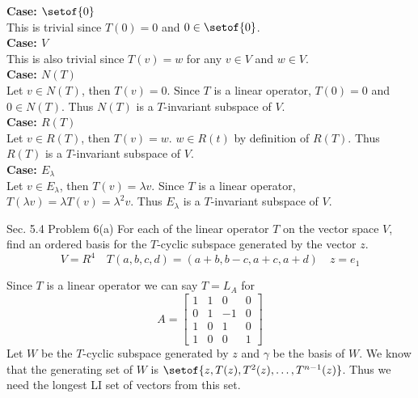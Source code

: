 \documentclass[answers,12pt,addpoints]{exam}
\begin{document}
\begin{questions}
    \begin{solution}
        \textbf{Case: $\setof{0}$}\\
        This is trivial since $T(0) = 0$ and $0 \in \setof{0}$.\\
        \textbf{Case: $V$}\\
        This is also trivial since $T(v) = w$ for any $v \in V$ and $w \in V$.\\
        \textbf{Case: $N(T)$}\\
        Let $v \in N(T)$, then $T(v) = 0$. Since $T$ is a linear operator, $T(0) = 0$ and $0 \in N(T)$. Thus $N(T)$ is a $T$-invariant subspace of $V$.\\
        \textbf{Case: $R(T)$}\\
        Let $v \in R(T)$, then $T(v) = w$. $w \in R(t)$ by definition of $R(T)$. Thus $R(T)$ is a $T$-invariant subspace of $V$.\\
        \textbf{Case: $E_{\lambda}$}\\
        Let $v \in E_{\lambda}$, then $T(v) = \lambda v$. Since $T$ is a linear operator, $T(\lambda v) = \lambda T(v) = \lambda^2 v$. Thus $E_{\lambda}$ is a $T$-invariant subspace of $V$.
    \end{solution}
    \question Sec. 5.4 Problem 6(a)
    For each of the linear operator $T$ on the vector space $V$, find an ordered basis for the $T$-cyclic subspace generated by the vector $z$.\\
    $$V = R^4 \quad T(a,b,c,d) = (a+b, b-c,a+c,a+d) \quad z = e_1$$
    \begin{solution}
        Since $T$ is a linear operator we can say $T = L_A$ for 
        $$A = \begin{bmatrix}
            1 & 1 & 0 & 0\\
            0 & 1 & -1 & 0\\
            1 & 0 & 1 & 0\\
            1 & 0 & 0 & 1
        \end{bmatrix}$$
        Let $W$ be the $T$-cyclic subspace generated by $z$ and $\gamma$ be the basis of $W$. We know that the generating set of $W$ is $\setof{z, T(z), T^2(z), \ldots, T^{n-1}(z)}$. Thus we need the longest LI set of vectors from this set.\\

\end{solution}
\end{questions}
\end{document}
